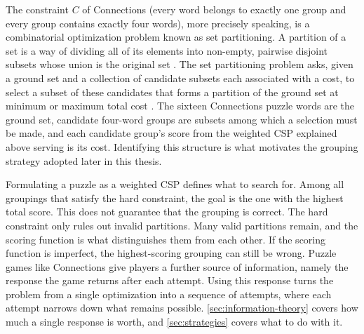The constraint $C$ of Connections (every word belongs to exactly one group and every group contains exactly four words), more precisely speaking, is a combinatorial optimization problem known as set partitioning. A partition of a set is a way of dividing all of its elements into non-empty, pairwise disjoint subsets whose union is the original set \cite{PartitionSet2026}. The set partitioning problem asks, given a ground set and a collection of candidate subsets each associated with a cost, to select a subset of these candidates that forms a partition of the ground set at minimum or maximum total cost \cite{muellerSolvingSetPartitioning1998}. The sixteen Connections puzzle words are the ground set, candidate four-word groups are subsets among which a selection must be made, and each candidate group's score from the weighted \ac{CSP} explained above serving is its cost. Identifying this structure is what motivates the grouping strategy adopted later in this thesis.

Formulating a puzzle as a weighted CSP defines what to search for. Among all groupings that satisfy the hard constraint, the goal is the one with the highest total score. This does not guarantee that the grouping is correct. The hard constraint only rules out invalid partitions. Many valid partitions remain, and the scoring function is what distinguishes them from each other. If the scoring function is imperfect, the highest-scoring grouping can still be wrong. Puzzle games like Connections give players a further source of information, namely the response the game returns after each attempt. Using this response turns the problem from a single optimization into a sequence of attempts, where each attempt narrows down what remains possible. \autoref{sec:information-theory} covers how much a single response is worth, and \autoref{sec:strategies} covers what to do with it.

\label{sec:information-theory}

